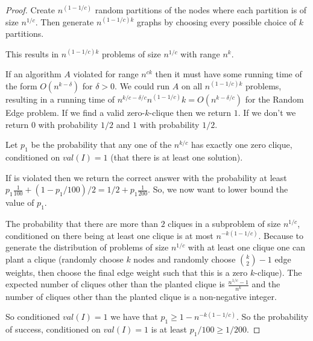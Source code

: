 \begin{proof}
	Create $n^{(1-1/c)}$ random partitions of the nodes where each partition is of size $n^{1/c}$. Then generate $n^{(1-1/c)k}$ graphs by choosing every possible choice of $k$ partitions.
	
	This results in $n^{(1-1/c)k}$ problems of size  $n^{1/c}$ with range $n^k$. 
	
	If an algorithm $A$ violated \Strongzkc for range $n^{c k}$ then it must have some running time of the form $O(n^{k-\delta})$ for $\delta > 0$. We could run $A$ on all $n^{(1-1/c)k}$ problems, resulting in a running time of $n^{k/c-\delta/c}n^{(1-1/c)}k = O(n^{k-\delta/c})$ for the Random Edge problem. If we find a valid zero-$k$-clique then we return $1$. If we don't we return $0$ with probability $1/2$ and $1$ with probability $1/2$.
	
	Let $p_1$ be the probability that any one of the $n^{k/c}$ has exactly one zero clique, conditioned on $val(I)=1$ (that there is at least one solution). 
	
	If \Strongzkc is violated then we return the correct answer with the probability at least $p_1 \frac{1}{100} + (1-p_1/100)/2 = 1/2+p_1\frac{1}{200}$. So, we now want to lower bound the value of $p_1$. 
	
	
	The probability that there are more than $2$ cliques in a subproblem of size  $n^{1/c}$, conditioned on there being at least one clique is at most $n^{-k(1-1/c)}$. Because to generate the distribution of problems of size $n^{1/c}$ with at least one clique one can plant a clique (randomly choose $k$ nodes and randomly choose $\binom{k}{2}-1$ edge weights, then choose the final edge weight such that this is a zero $k$-clique). The expected number of cliques other than the planted clique is $\frac{n^{1/c}-1}{n^k}$ and the number of cliques other than the planted clique is a non-negative integer.
	
	So conditioned $val(I)=1$ we have that $p_1\geq 1-n^{-k(1-1/c)}$. So the probability of success, conditioned on $val(I)=1$  is at least $p_1/100 \geq 1/200$.
	
	
	

\end{proof}
